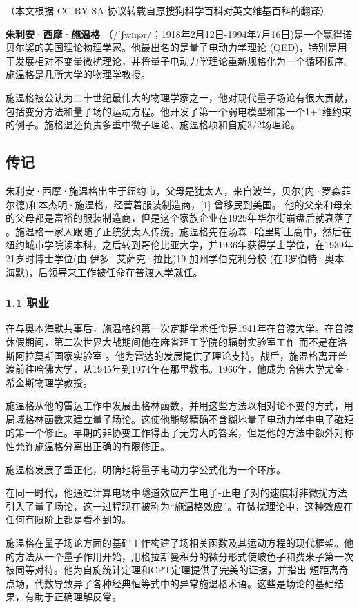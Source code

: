 
（本文根据 CC-BY-SA 协议转载自原搜狗科学百科对英文维基百科的翻译）

\textbf{朱利安·西摩·施温格} （/ˈʃwɪŋər/；1918年2月12日-1994年7月16日)是一个赢得诺贝尔奖的美国理论物理学家。他最出名的是量子电动力学理论 (QED)，特别是用于发展相对不变量微扰理论，并将量子电动力学理论重新规格化为一个循环顺序。施温格是几所大学的物理学教授。

施温格被公认为二十世纪最伟大的物理学家之一，他对现代量子场论有很大贡献，包括变分方法和量子场的运动方程。他开发了第一个弱电模型和第一个1+1维约束的例子。施格温还负责多重中微子理论、施温格项和自旋3/2场理论。

\subsection{传记}
朱利安·西摩·施温格出生于纽约市，父母是犹太人，来自波兰，贝尔(内·罗森菲尔德)和本杰明·施温格，经营着服装制造商，[1] 曾移民到美国。 他的父亲和母亲的父母都是富裕的服装制造商，但是这个家族企业在1929年华尔街崩盘后就衰落了 。施温格一家人跟随了正统犹太人传统。施温格先在汤森·哈里斯上高中，然后在纽约城市学院读本科，之后转到哥伦比亚大学，并1936年获得学士学位，在1939年21岁时博士学位(由 伊多·艾萨克·拉比)19 加州学伯克利分校 (在J罗伯特·奥本海默)，后领导来工作被任命在普渡大学就任。

\subsubsection{1.1 职业}
在与奥本海默共事后，施温格的第一次定期学术任命是1941年在普渡大学。在普渡休假期间，第二次世界大战期间他在麻省理工学院的辐射实验室工作 而不是在洛斯阿拉莫斯国家实验室 。他为雷达的发展提供了理论支持。战后，施温格离开普渡前往哈佛大学，从1945年到1974年在那里教书。1966年，他成为哈佛大学尤金·希金斯物理学教授。

施温格从他的雷达工作中发展出格林函数，并用这些方法以相对论不变的方式，用局域格林函数来建立量子场论。这使他能够精确不含糊地量子电动力学中电子磁矩的第一个修正。早期的非协变工作得出了无穷大的答案，但是他的方法中额外对称性允许施温格分离出正确的有限修正。

施温格发展了重正化，明确地将量子电动力学公式化为一个环序。

在同一时代，他通过计算电场中隧道效应产生电子-正电子对的速度将非微扰方法引入了量子场论，这一过程现在被称为“施温格效应”。在微扰理论中，这种效应在任何有限阶上都是看不到的。

施温格在量子场论方面的基础工作构建了场相关函数及其运动方程的现代框架。他的方法从一个量子作用开始，用格拉斯曼积分的微分形式使玻色子和费米子第一次被同等对待。他为自旋统计定理和CPT定理提供了完美的证据，并指出 短距离奇点场，代数导致异了各种经典恒等式中的异常施温格术语。这些是场论的基础结果，有助于正确理解反常。

